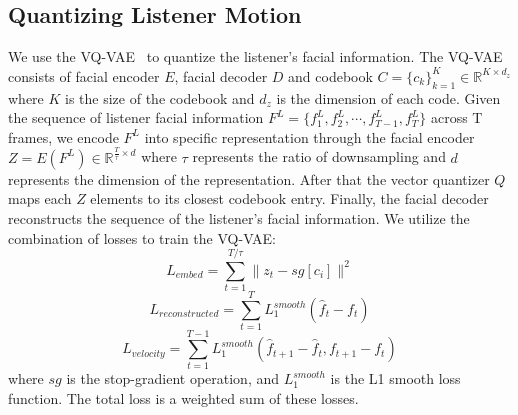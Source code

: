 \subsection{Quantizing Listener Motion}
We use the VQ-VAE~\cite{van2017neural} to quantize the listener's facial information.
The VQ-VAE consists of facial encoder $\mathit{E}$, facial decoder $\mathit{D}$ and codebook $C = \{c_k\}^K_{k=1} \in \mathbb{R}^{K \times d_z}$ where $K$ is the size of the codebook and $d_z$ is the dimension of each code. Given the sequence of listener facial information $F^{L}=\{ f^{L}_1, f^{L}_2, \cdots, f^{L}_{T-1}, f^{L}_T \} $ across T frames,
we encode $F^{L}$ into specific representation through the facial encoder ${Z}=\mathit{E}(F^{L}) \in \mathbb{R}^{\frac{T}{\tau} \times d}$  where $\tau$ represents the ratio of downsampling and $d$ represents the dimension of the representation.
After that the vector quantizer $\mathit Q$ maps each ${Z}$ elements to its closest codebook entry.
Finally, the facial decoder reconstructs the sequence of the listener's facial information. We utilize the combination of losses to train the VQ-VAE:
\begin{equation}
    L_{embed} = \sum_{t=1}^{T/\tau}\parallel z_t-sg[c_i] \parallel^2
\end{equation}
\begin{equation}
    L_{reconstructed} = \sum_{t=1}^T \mathit L_{1}^{smooth} (\hat f_t - f_t)
\end{equation}
\begin{equation}
    L_{velocity} = \sum_{t=1}^{T-1} \mathit L_{1}^{smooth} (\hat f_{t+1} - \hat f_t, f_{t+1} - f_t)
\end{equation}
where $sg$ is the stop-gradient operation, and $\mathit L_{1}^{smooth}$ is the L1 smooth loss function. The total loss is a weighted sum of these losses. 

